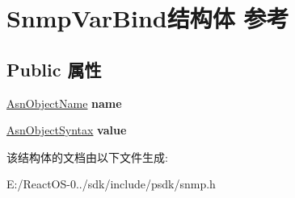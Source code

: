 \hypertarget{struct_snmp_var_bind}{}\section{Snmp\+Var\+Bind结构体 参考}
\label{struct_snmp_var_bind}
\subsection*{Public 属性}
\begin{DoxyCompactItemize}
\item 
\mbox{\label{struct_snmp_var_bind_a72f6f401e02f067fcd1d46b11e849aee}} 
\hyperlink{struct_asn_object_identifier}{Asn\+Object\+Name} {\bfseries name}
\item 
\mbox{\label{struct_snmp_var_bind_ab9aeb9c7dd4f2db4160a34644f043de0}} 
\hyperlink{struct_asn_any}{Asn\+Object\+Syntax} {\bfseries value}
\end{DoxyCompactItemize}


该结构体的文档由以下文件生成\+:\begin{DoxyCompactItemize}
\item 
E\+:/\+React\+O\+S-\/0../sdk/include/psdk/snmp.\+h\end{DoxyCompactItemize}
